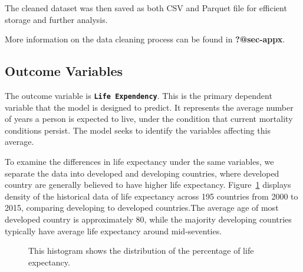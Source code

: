 \documentclass[
  letterpaper,
  DIV=11,
  numbers=noendperiod]{scrartcl}
\begin{document}
The cleaned dataset was then saved as both CSV and Parquet file for
efficient storage and further analysis.

More information on the data cleaning process can be found in
\textbf{?@sec-appx}.

\subsection{Outcome Variables}\label{outcome-variables}

The outcome variable is \textbf{\texttt{Life\ Expendency}}. This is the
primary dependent variable that the model is designed to predict. It
represents the average number of years a person is expected to live,
under the condition that current mortality conditions persist. The model
seeks to identify the variables affecting this average.

To examine the differences in life expectancy under the same variables,
we separate the data into developed and developing countries, where
developed country are generally believed to have higher life expectancy.
Figure~\ref{fig-expectancy} displays density of the historical data of
life expectancy across 195 countries from 2000 to 2015, comparing
developing to developed countries.The average age of most developed
country is approximately 80, while the majority developing countries
typically have average life expectancy around mid-seventies.

\begin{figure}


\caption{\label{fig-expectancy}This histogram shows the distribution of
the percentage of life expectancy.}

\end{figure}%
\end{document}
